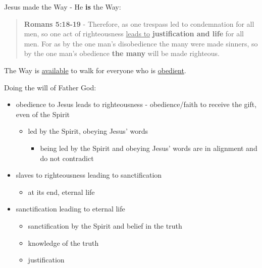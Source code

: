 \documentclass[11pt]{article}
\begin{document}
Jesus made the Way - He \textbf{is} the Way:

\begin{quote}
\textbf{Romans 5:18-19} - Therefore, as one trespass led to condemnation for all men, so one act of righteousness \uline{leads to} \textbf{justification and life} for all men. For as by the one man's disobedience the many were made sinners, so by the one man's obedience \textbf{the many} will be made righteous.
\end{quote}

The Way is \uline{available} to walk for everyone who is \uline{obedient}.

Doing the will of Father God:
\begin{itemize}
\item obedience to Jesus leads to righteousness - obedience/faith to receive the gift, even of the Spirit
\begin{itemize}
\item led by the Spirit, obeying Jesus' words
\begin{itemize}
\item being led by the Spirit and obeying Jesus' words are in alignment and do not contradict
\end{itemize}
\end{itemize}
\item slaves to righteousness leading to sanctification
\begin{itemize}
\item at its end, eternal life
\end{itemize}
\item sanctification leading to eternal life
\begin{itemize}
\item sanctification by the Spirit and belief in the truth
\item knowledge of the truth
\item justification
\end{itemize}
\end{itemize}
\end{document}
